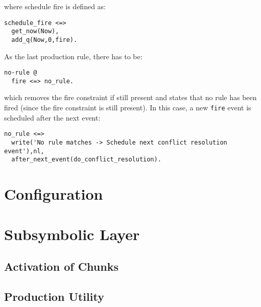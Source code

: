 where schedule fire is defined as:

\begin{lstlisting}
schedule_fire <=> 
  get_now(Now),
  add_q(Now,0,fire).
\end{lstlisting}

As the last production rule, there has to be:

\begin{lstlisting}
no-rule @ 
  fire <=> no_rule.
\end{lstlisting}

which removes the fire constraint if still present and states that no rule has been fired (since the fire constraint is still present). In this case, a new \verb|fire| event is scheduled after the next event:

\begin{lstlisting}
no_rule <=> 
  write('No rule matches -> Schedule next conflict resolution event'),nl,
  after_next_event(do_conflict_resolution).
\end{lstlisting}

\section{Configuration}


\section{Subsymbolic Layer}

\subsection{Activation of Chunks}

\subsection{Production Utility}


